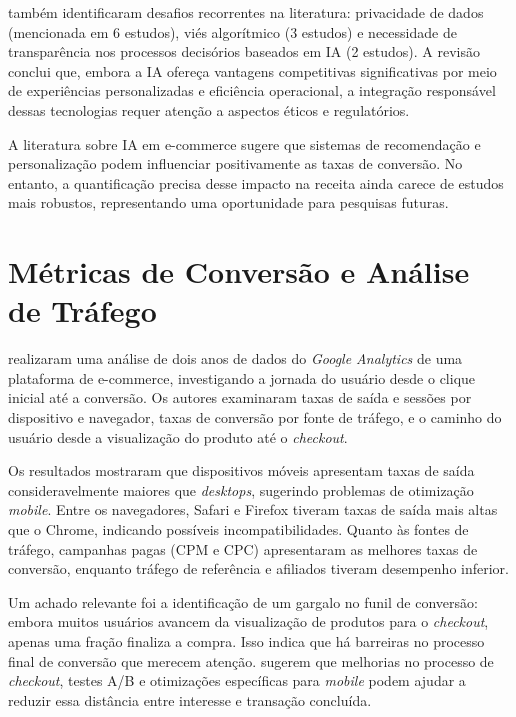 \cite{saleh_artificial_2025} também identificaram desafios recorrentes na literatura: privacidade de dados (mencionada em 6 estudos), viés algorítmico (3 estudos) e necessidade de transparência nos processos decisórios baseados em IA (2 estudos). A revisão conclui que, embora a IA ofereça vantagens competitivas significativas por meio de experiências personalizadas e eficiência operacional, a integração responsável dessas tecnologias requer atenção a aspectos éticos e regulatórios.

A literatura sobre IA em e-commerce sugere que sistemas de recomendação e personalização podem influenciar positivamente as taxas de conversão. No entanto, a quantificação precisa desse impacto na receita ainda carece de estudos mais robustos, representando uma oportunidade para pesquisas futuras.

\section{Métricas de Conversão e Análise de Tráfego}

\cite{muralidhar_clicks_2024} realizaram uma análise de dois anos de dados do \textit{Google Analytics} de uma plataforma de e-commerce, investigando a jornada do usuário desde o clique inicial até a conversão. Os autores examinaram taxas de saída e sessões por dispositivo e navegador, taxas de conversão por fonte de tráfego, e o caminho do usuário desde a visualização do produto até o \textit{checkout}.

Os resultados mostraram que dispositivos móveis apresentam taxas de saída consideravelmente maiores que \textit{desktops}, sugerindo problemas de otimização \textit{mobile}. Entre os navegadores, Safari e Firefox tiveram taxas de saída mais altas que o Chrome, indicando possíveis incompatibilidades. Quanto às fontes de tráfego, campanhas pagas (CPM e CPC) apresentaram as melhores taxas de conversão, enquanto tráfego de referência e afiliados tiveram desempenho inferior.

Um achado relevante foi a identificação de um gargalo no funil de conversão: embora muitos usuários avancem da visualização de produtos para o \textit{checkout}, apenas uma fração finaliza a compra. Isso indica que há barreiras no processo final de conversão que merecem atenção. \cite{muralidhar_clicks_2024} sugerem que melhorias no processo de \textit{checkout}, testes A/B e otimizações específicas para \textit{mobile} podem ajudar a reduzir essa distância entre interesse e transação concluída.


